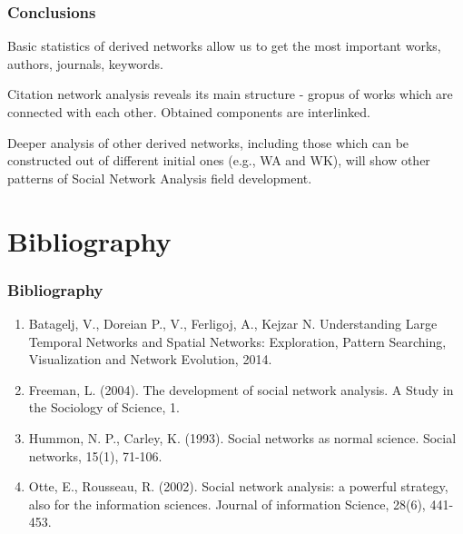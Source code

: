 \documentclass[hyperref={pdfstartview={FitBH -32768},
                         pdfpagemode=FullScreen,
                         plainpages=false,
                         colorlinks=true}
              ]{beamer}
\begin{document}
\begin{frame}[fragile]
\frametitle{Conclusions}
\small

Basic statistics of derived networks allow us to get the most important works, authors, journals, keywords. \medskip

Citation network analysis reveals its main structure - gropus of works which are connected with each other. Obtained components are interlinked. \medskip

Deeper analysis of other derived networks, including those which can be constructed out of different initial ones (e.g., WA and WK), will show other patterns of Social Network Analysis field development. 


\end{frame}

\section{Bibliography}  


\begin{frame}[fragile]
\frametitle{Bibliography}
\small

\begin{enumerate}
\item Batagelj, V., Doreian P., V., Ferligoj, A., Kejzar N. Understanding Large Temporal Networks and Spatial Networks: Exploration, Pattern Searching, Visualization and Network Evolution, 2014.
\item Freeman, L. (2004). The development of social network analysis. A Study in the Sociology of Science, 1.
\item Hummon, N. P., Carley, K. (1993). Social networks as normal science. Social networks, 15(1), 71-106.
\item Otte, E., Rousseau, R. (2002). Social network analysis: a powerful strategy, also for the information sciences. Journal of information Science, 28(6), 441-453. 
\end{enumerate}
\end{frame}
\end{document}
